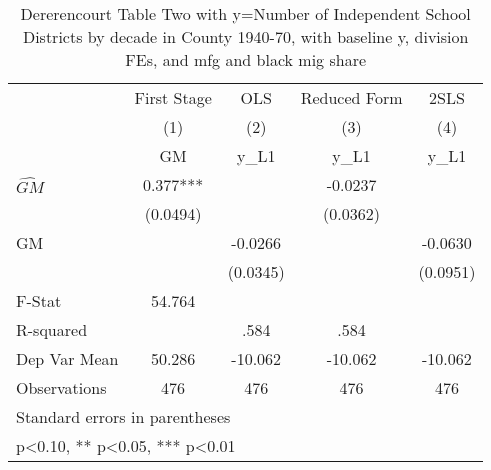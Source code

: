 \begin{table}[htbp]\centering
\def\sym#1{\ifmmode^{#1}\else\(^{#1}\)\fi}
\caption{Dererencourt Table Two with y=Number of Independent School Districts by decade in County 1940-70, with baseline y, division FEs, and mfg and black mig share}
\begin{tabular}{l*{4}{c}}
\toprule
                    & First Stage   &         OLS   &Reduced Form   &        2SLS   \\
                    &\multicolumn{1}{c}{(1)}&\multicolumn{1}{c}{(2)}&\multicolumn{1}{c}{(3)}&\multicolumn{1}{c}{(4)}\\
                    &\multicolumn{1}{c}{GM}&\multicolumn{1}{c}{y\_L1}&\multicolumn{1}{c}{y\_L1}&\multicolumn{1}{c}{y\_L1}\\
\midrule
$\hat{GM}$          &       0.377***&               &     -0.0237   &               \\
                    &    (0.0494)   &               &    (0.0362)   &               \\
\addlinespace
GM                  &               &     -0.0266   &               &     -0.0630   \\
                    &               &    (0.0345)   &               &    (0.0951)   \\
\midrule
F-Stat              &      54.764   &               &               &               \\
R-squared           &               &        .584   &        .584   &               \\
Dep Var Mean        &      50.286   &     -10.062   &     -10.062   &     -10.062   \\
Observations        &         476   &         476   &         476   &         476   \\
\bottomrule
\multicolumn{5}{l}{\footnotesize Standard errors in parentheses}\\
\multicolumn{5}{l}{\footnotesize * p<0.10, ** p<0.05, *** p<0.01}\\
\end{tabular}
\end{table}
